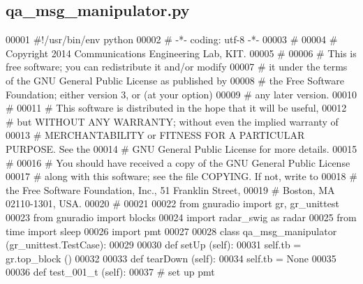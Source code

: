 \subsection{qa\+\_\+msg\+\_\+manipulator.\+py}
\label{qa__msg__manipulator_8py_source}

\begin{DoxyCode}
00001 \textcolor{comment}{#!/usr/bin/env python}
00002 \textcolor{comment}{# -*- coding: utf-8 -*-}
00003 \textcolor{comment}{# }
00004 \textcolor{comment}{# Copyright 2014 Communications Engineering Lab, KIT.}
00005 \textcolor{comment}{# }
00006 \textcolor{comment}{# This is free software; you can redistribute it and/or modify}
00007 \textcolor{comment}{# it under the terms of the GNU General Public License as published by}
00008 \textcolor{comment}{# the Free Software Foundation; either version 3, or (at your option)}
00009 \textcolor{comment}{# any later version.}
00010 \textcolor{comment}{# }
00011 \textcolor{comment}{# This software is distributed in the hope that it will be useful,}
00012 \textcolor{comment}{# but WITHOUT ANY WARRANTY; without even the implied warranty of}
00013 \textcolor{comment}{# MERCHANTABILITY or FITNESS FOR A PARTICULAR PURPOSE.  See the}
00014 \textcolor{comment}{# GNU General Public License for more details.}
00015 \textcolor{comment}{# }
00016 \textcolor{comment}{# You should have received a copy of the GNU General Public License}
00017 \textcolor{comment}{# along with this software; see the file COPYING.  If not, write to}
00018 \textcolor{comment}{# the Free Software Foundation, Inc., 51 Franklin Street,}
00019 \textcolor{comment}{# Boston, MA 02110-1301, USA.}
00020 \textcolor{comment}{# }
00021 
00022 \textcolor{keyword}{from} gnuradio \textcolor{keyword}{import} gr, gr\_unittest
00023 \textcolor{keyword}{from} gnuradio \textcolor{keyword}{import} blocks
00024 \textcolor{keyword}{import} radar\_swig \textcolor{keyword}{as} radar
00025 \textcolor{keyword}{from} time \textcolor{keyword}{import} sleep
00026 \textcolor{keyword}{import} pmt
00027 
00028 \textcolor{keyword}{class }qa_msg_manipulator (gr\_unittest.TestCase):
00029 
00030     \textcolor{keyword}{def }setUp (self):
00031         self.tb = gr.top\_block ()
00032 
00033     \textcolor{keyword}{def }tearDown (self):
00034         self.tb = \textcolor{keywordtype}{None}
00035 
00036     \textcolor{keyword}{def }test_001_t (self):
00037         \textcolor{comment}{# set up pmt}

\end{DoxyCode}

